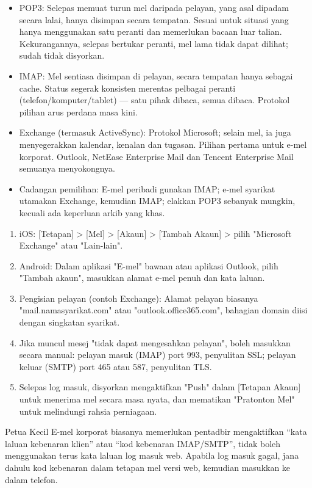 \begin{itemize}
  \item POP3: Selepas memuat turun mel daripada pelayan, yang asal dipadam secara lalai, hanya disimpan secara tempatan. Sesuai untuk situasi yang hanya menggunakan satu peranti dan memerlukan bacaan luar talian. Kekurangannya, selepas bertukar peranti, mel lama tidak dapat dilihat; sudah tidak disyorkan.
  \item IMAP: Mel sentiasa disimpan di pelayan, secara tempatan hanya sebagai cache. Status segerak konsisten merentas pelbagai peranti (telefon/komputer/tablet) — satu pihak dibaca, semua dibaca. Protokol pilihan arus perdana masa kini.
  \item Exchange (termasuk ActiveSync): Protokol Microsoft; selain mel, ia juga menyegerakkan kalendar, kenalan dan tugasan. Pilihan pertama untuk e-mel korporat. Outlook, NetEase Enterprise Mail dan Tencent Enterprise Mail semuanya menyokongnya.
  \item Cadangan pemilihan: E-mel peribadi gunakan IMAP; e-mel syarikat utamakan Exchange, kemudian IMAP; elakkan POP3 sebanyak mungkin, kecuali ada keperluan arkib yang khas.
\end{itemize}


\begin{enumerate}
  \item iOS: [Tetapan] > [Mel] > [Akaun] > [Tambah Akaun] > pilih "Microsoft Exchange" atau "Lain-lain".
  \item Android: Dalam aplikasi "E-mel" bawaan atau aplikasi Outlook, pilih "Tambah akaun", masukkan alamat e-mel penuh dan kata laluan.
  \item Pengisian pelayan (contoh Exchange): Alamat pelayan biasanya "mail.namasyarikat.com" atau "outlook.office365.com", bahagian domain diisi dengan singkatan syarikat.
  \item Jika muncul mesej "tidak dapat mengesahkan pelayan", boleh masukkan secara manual: pelayan masuk (IMAP) port 993, penyulitan SSL; pelayan keluar (SMTP) port 465 atau 587, penyulitan TLS.
  \item Selepas log masuk, disyorkan mengaktifkan "Push" dalam [Tetapan Akaun] untuk menerima mel secara masa nyata, dan mematikan "Pratonton Mel" untuk melindungi rahsia perniagaan.
\end{enumerate}

\begin{tcbinfo}{Petua Kecil}
E-mel korporat biasanya memerlukan pentadbir mengaktifkan “kata laluan kebenaran klien” atau “kod kebenaran IMAP/SMTP”, tidak boleh menggunakan terus kata laluan log masuk web. Apabila log masuk gagal, jana dahulu kod kebenaran dalam tetapan mel versi web, kemudian masukkan ke dalam telefon.

\end{tcbinfo}

